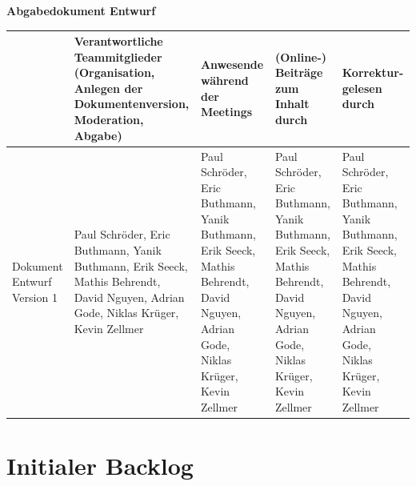 \documentclass{article}
\begin{document}
\begin{titlepage}
	{
		\centering
		\huge
		\textbf{Abgabedokument Entwurf}\\
	}
	\vspace{1cm}
	\begin{table}[h]
		\centering
		\footnotesize
		\begin{tabular}{| p{1.5cm} | p{2.5cm} | p{2cm} | p{2cm} | p{2cm} |}
			\hline
			                           & Verantwortliche Teammitglieder (Organisation, Anlegen der Dokumentenversion, Moderation, Abgabe)                                   & Anwesende während der Meetings                                                                                                     & (Online-) Beiträge zum Inhalt durch                                                                                                & Korrektur-gelesen durch                                                                                                            \\
			\hline
			Dokument Entwurf Version 1 & Paul Schröder, Eric Buthmann, Yanik Buthmann, Erik Seeck, Mathis Behrendt, David Nguyen, Adrian Gode, Niklas Krüger, Kevin Zellmer & Paul Schröder, Eric Buthmann, Yanik Buthmann, Erik Seeck, Mathis Behrendt, David Nguyen, Adrian Gode, Niklas Krüger, Kevin Zellmer & Paul Schröder, Eric Buthmann, Yanik Buthmann, Erik Seeck, Mathis Behrendt, David Nguyen, Adrian Gode, Niklas Krüger, Kevin Zellmer & Paul Schröder, Eric Buthmann, Yanik Buthmann, Erik Seeck, Mathis Behrendt, David Nguyen, Adrian Gode, Niklas Krüger, Kevin Zellmer \\
			\hline
		\end{tabular}
	\end{table}
\end{titlepage}

\section{Initialer Backlog}
\end{document}
